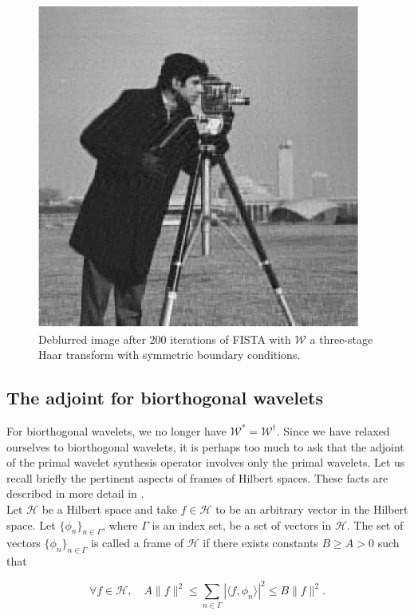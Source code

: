 \documentclass[journal]{IEEEtran}
\begin{document}
\begin{figure}
   \centering
   \includegraphics[width=0.8\columnwidth]{figures/cameraman_rec_200_db1_sym_trim.pdf}
   \caption{Deblurred image after 200 iterations of FISTA with $\mathcal{W}$ a three-stage Haar transform with symmetric boundary conditions.}
   \label{fig:cameraman_200_db1_sym}
\end{figure}


\subsection{The adjoint for biorthogonal wavelets}
For biorthogonal wavelets, we no longer have $\mathcal{W}^\ast=\mathcal{W}^\dagger$.  Since we have relaxed ourselves to biorthogonal wavelets, it is perhaps too much to ask that the adjoint of the primal wavelet synthesis operator involves only the primal wavelets.  Let us recall briefly the pertinent aspects of frames of Hilbert spaces.  These facts are described in more detail in \cite{mallat_2009}.\\

Let $\mathcal{H}$ be a Hilbert space and take $f\in\mathcal{H}$ to be an arbitrary vector in the Hilbert space.  Let $\{\phi_n\}_{n\in\Gamma}$, where $\Gamma$ is an index set, be a set of vectors in $\mathcal{H}$.  The set of vectors $\{\phi_n\}_{n\in\Gamma}$ is called a frame of $\mathcal{H}$ if there exists constants $B\ge A > 0$ such that

\[ \forall f\in \mathcal{H}, \quad A\|f\|^2 \le \sum_{n\in\Gamma} |\langle f,\phi_n\rangle|^2\le B \|f\|^2. \] 
\end{document}
